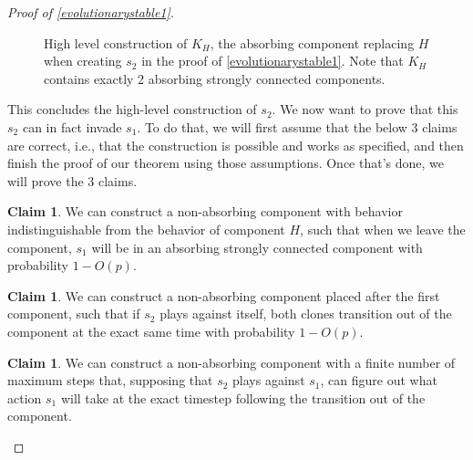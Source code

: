 \documentclass[11pt]{amsart}
\theoremstyle{definition}
\newtheorem{claim}[theorem]{Claim}
\theoremstyle{remark}
\begin{document}
\begin{proof}[Proof of \cref{evolutionarystable1}]
\begin{figure}
        \caption{High level construction of $K_H$, the absorbing component replacing $H$ when creating $s_2$ in the proof of \cref{evolutionarystable1}. Note that $K_H$ contains exactly 2 absorbing strongly connected components.}
        \label{c2flowchart}
      \end{figure}
      
      This concludes the high-level construction of $s_2$. We now want to prove that this $s_2$ can in fact invade $s_1$. To do that, we will first assume that the below 3 claims are correct, i.e., that the construction is possible and works as specified, and then finish the proof of our theorem using those assumptions. Once that's done, we will prove the 3 claims.

      \begin{claim}
        \label{claimcanwaitfors1}
        We can construct a non-absorbing component with behavior indistinguishable from the behavior of component $H$, such that when we leave the component, $s_1$ will be in an absorbing strongly connected component with probability $1 - O(p)$.
      \end{claim}

      \begin{claim}
        \label{claimcansyncs2}
        We can construct a non-absorbing component placed after the first component, such that if $s_2$ plays against itself, both clones transition out of the component at the exact same time with probability $1 - O(p)$.
      \end{claim}

      \begin{claim}
        \label{claimcanfigureout}
        We can construct a non-absorbing component with a finite number of maximum steps that, supposing that $s_2$ plays against $s_1$, can figure out what action $s_1$ will take at the exact timestep following the transition out of the component.
      \end{claim}


\end{proof}
\end{document}
